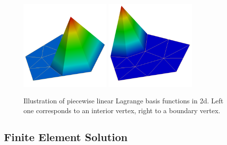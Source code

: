 \documentclass[a4paper,12pt]{article}
\begin{document}
\begin{figure}
\begin{center}
\includegraphics[width=0.4\textwidth]{p1_1}\hspace{0.1\textwidth}
\includegraphics[width=0.4\textwidth]{p1_2}
\end{center}
\caption{Illustration of piecewise linear Lagrange basis functions in 2d. Left one 
corresponds to an interior vertex, right to a boundary vertex.}
\label{fig:p1basis}
\end{figure}

\subsection{Finite Element Solution}
\end{document}
